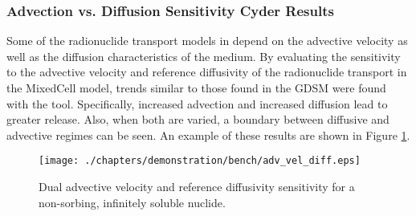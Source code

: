 
\subsubsection{Advection vs. Diffusion Sensitivity Cyder Results}
Some of the  radionuclide transport models in \Cyder depend on the advective velocity as well as the diffusion 
characteristics of the medium. By evaluating the sensitivity to the advective velocity and reference 
diffusivity of the radionuclide transport in the MixedCell model, trends similar to those found in the \gls{GDSM} were found with the \Cyder tool. 
Specifically, increased advection and increased diffusion lead to greater release. Also, when both are varied, a boundary between diffusive and advective
regimes can be seen. An example of these results are shown in Figure 
\ref{fig:dr_adv_diff}.
 
\begin{figure}[ht]
\centering
\texttt{[image: ./chapters/demonstration/bench/adv\_vel\_diff.eps]}
\caption[Advection vs. Diffusion Sensitivity in Cyder]{Dual advective velocity 
and reference diffusivity sensitivity for a non-sorbing, infinitely soluble 
nuclide.}
\label{fig:dr_adv_diff}
\end{figure}
